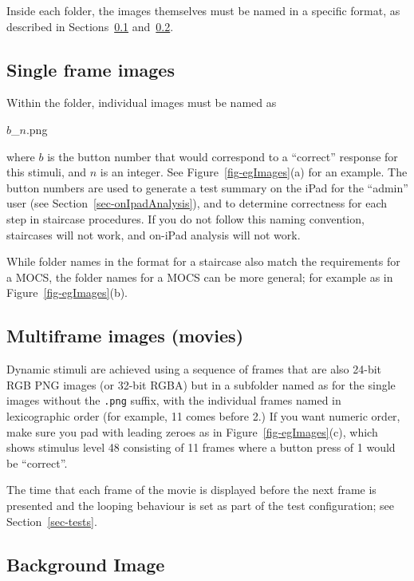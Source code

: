 \documentclass{article}
\begin{document}
Inside each folder, the images themselves must be named in a 
specific format, as described in Sections~\ref{sec-single-frame} and~\ref{sec-multi-frame}.

\subsection{Single frame images}
\label{sec-single-frame}

Within the folder, individual images must be named as 
\begin{center}
  $b$\_$n$.png
\end{center}
where $b$ is the button number that would correspond to a ``correct''
response for this stimuli, and $n$ is an integer.
See Figure~\ref{fig-egImages}(a) for an example.
The button numbers are used to generate a test summary on the iPad for 
the ``admin'' user
(see Section~\ref{sec-onIpadAnalysis}), 
and to determine correctness for each step in staircase procedures. 
If you do not follow this naming convention, staircases will not work, and 
on-iPad analysis will not work.

While folder names in the format for a staircase also match the 
requirements for 
a MOCS, the folder names for a MOCS can be more general; for example
as in Figure~\ref{fig-egImages}(b).



\subsection{Multiframe images (movies)}
\label{sec-multi-frame}

Dynamic stimuli are achieved using a sequence of frames that are also
24-bit RGB PNG images (or 32-bit RGBA) but in a subfolder named as for the single 
images without the {\tt .png} suffix, with the individual frames 
named in lexicographic order (for example, 11 comes before 2.) If you want
numeric order, make sure you pad with leading zeroes as in Figure~\ref{fig-egImages}(c),
which shows 
stimulus level 48 consisting of 11 frames where a button
press of 1 would be ``correct''.

The time that each frame of the movie is displayed before the next frame is
presented and the looping behaviour is set as part of the test configuration;
see Section~\ref{sec-tests}.

\subsection{Background Image}
\label{sect-bi}
\end{document}
